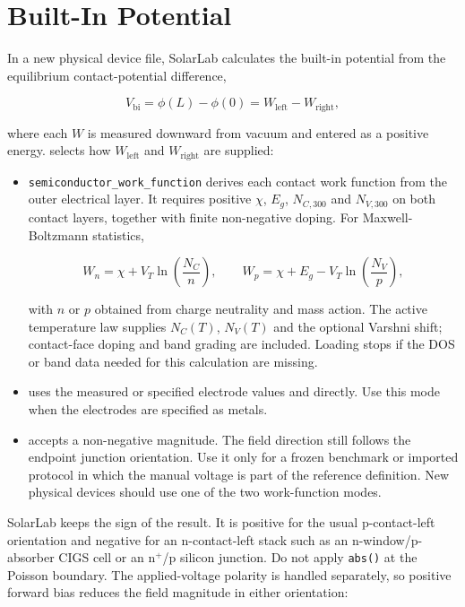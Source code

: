 \documentclass[
  11pt,
  american,
]{report}
\begin{document}
\hypertarget{built-in-potential}{%
\section{Built-In Potential}\label{built-in-potential}}

In a new physical device file, SolarLab calculates the built-in
potential from the equilibrium contact-potential difference,

\[
V_\mathrm{bi}=\phi(L)-\phi(0)=W_\mathrm{left}-W_\mathrm{right},
\]

where each \(W\) is measured downward from vacuum and entered as a
positive energy.  selects how
\(W_\mathrm{left}\) and \(W_\mathrm{right}\) are supplied:

\begin{itemize}
\item
  \texttt{semiconductor\_work\_function} derives each contact work
  function from the outer electrical layer. It requires positive
  \(\chi\), \(E_g\), \(N_{C,300}\) and \(N_{V,300}\) on both contact
  layers, together with finite non-negative doping. For
  Maxwell-Boltzmann statistics,

  \[
  W_n=\chi+V_T\ln\!\left(\frac{N_C}{n}\right),\qquad
  W_p=\chi+E_g-V_T\ln\!\left(\frac{N_V}{p}\right),
  \]

  with \(n\) or \(p\) obtained from charge neutrality and mass action.
  The active temperature law supplies \(N_C(T)\), \(N_V(T)\) and the
  optional Varshni shift; contact-face doping and band grading are
  included. Loading stops if the DOS or band data needed for this
  calculation are missing.
\item
   uses the measured or specified electrode
  values  and 
  directly. Use this mode when the electrodes are specified as metals.
\item
   accepts a non-negative 
  magnitude. The field direction still follows the endpoint junction
  orientation. Use it only for a frozen benchmark or imported protocol
  in which the manual voltage is part of the reference definition. New
  physical devices should use one of the two work-function modes.
\end{itemize}

SolarLab keeps the sign of the result. It is positive for the usual
p-contact-left orientation and negative for an n-contact-left stack such
as an n-window/p-absorber CIGS cell or an n\(^+\)/p silicon junction. Do
not apply \texttt{abs()} at the Poisson boundary. The applied-voltage
polarity is handled separately, so positive forward bias reduces the
field magnitude in either orientation:
\end{document}

